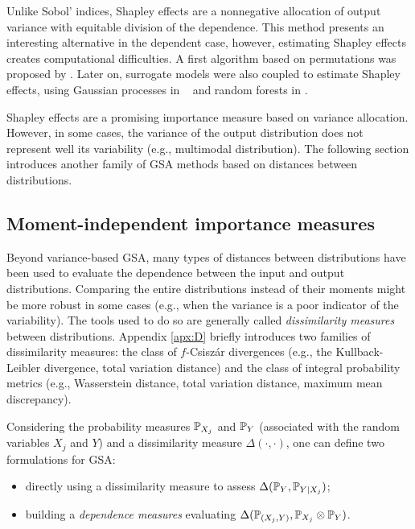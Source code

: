 Unlike Sobol' indices, Shapley effects are a nonnegative allocation of output variance with equitable division of the dependence. 
This method presents an interesting alternative in the dependent case, however, estimating Shapley effects creates computational difficulties. 
A first algorithm based on permutations was proposed by \citet{song_2016_shapley}. 
Later on, surrogate models were also coupled to estimate Shapley effects, using Gaussian processes in \citet{nazben_2019_shapley}\footnotemark~ and random forests in \citet{benard_2022_shaff}. 


Shapley effects are a promising importance measure based on variance allocation. 
However, in some cases, the variance of the output distribution does not represent well its variability (e.g., multimodal distribution). 
The following section introduces another family of GSA methods based on distances between distributions.


\subsection{Moment-independent importance measures}
Beyond variance-based GSA, many types of distances between distributions have been used to evaluate the dependence between the input and output distributions. 
Comparing the entire distributions instead of their moments might be more robust in some cases (e.g., when the variance is a poor indicator of the variability). 
The tools used to do so are generally called \textit{dissimilarity measures} between distributions.  
Appendix \ref{apx:D} briefly introduces two families of dissimilarity measures: the class of $f$-Csisz\'{a}r divergences (e.g., the Kullback-Leibler divergence, total variation distance) and the class of integral probability metrics (e.g., Wasserstein distance, total variation distance, maximum mean discrepancy). 

Considering the probability measures $\P_{X_j}$ and $\P_{Y}$ (associated with the random variables $X_j$ and $Y$) and a dissimilarity measure $\Delta(\cdot, \cdot)$, one can define two formulations for GSA: 
\begin{itemize}
    \item directly using a dissimilarity measure to assess $\Delta(\P_Y, \P_{Y |X_j})$;
    \item building a \textit{dependence measures} evaluating $\Delta(\P_{(X_j, Y)}, \P_{X_j} \otimes \P_Y)$.
\end{itemize}

